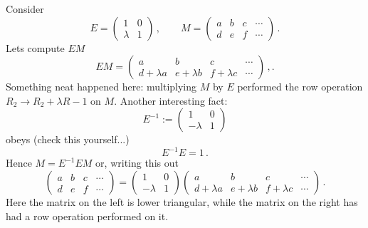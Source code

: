 \begin{example}
Consider $$E=\begin{pmatrix}1&0\\\lambda&1\end{pmatrix}\, ,\qquad M=\begin{pmatrix}a&b&c&\cdots\\d&e&f&\cdots\end{pmatrix}\, .$$
Lets compute $EM$
$$
EM=\begin{pmatrix}a&b&c&\cdots\\d+\lambda a&e+\lambda b&f+\lambda c&\cdots\end{pmatrix}\, ,.
$$
Something neat happened here: multiplying $M$ by $E$ performed the row operation $R_2\to R_2+\lambda R-1$ on $M$.
Another interesting fact:
$$
E^{-1}:=\begin{pmatrix}1&0\\-\lambda&1\end{pmatrix}
$$ 
obeys (check this yourself...)
$$
E^{-1} E = 1\, .
$$
Hence $M=E^{-1} E M$ or, writing this out
$$
\begin{pmatrix}a&b&c&\cdots\\d&e&f&\cdots\end{pmatrix}=\begin{pmatrix}1&0\\-\lambda&1\end{pmatrix} \begin{pmatrix}a&b&c&\cdots\\d+\lambda a&e+\lambda b&f+\lambda c&\cdots\end{pmatrix}\, .
$$
Here the matrix on the left is lower triangular, while the matrix on the right has had a row operation performed on it.
\end{example}




